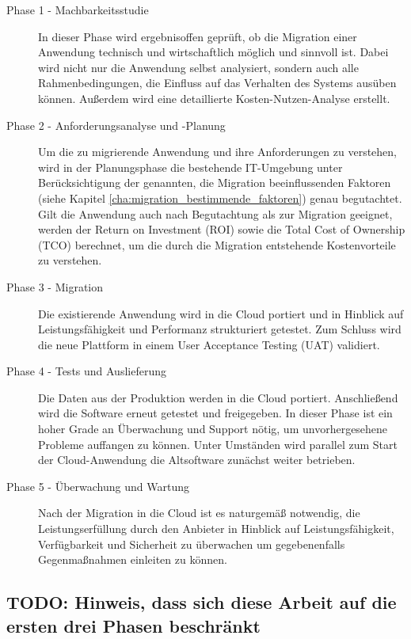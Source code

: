 \begin{description}
	\item[Phase 1 - Machbarkeitsstudie] In dieser Phase wird ergebnisoffen
geprüft, ob die Migration einer Anwendung technisch und wirtschaftlich möglich
und sinnvoll ist. Dabei wird nicht nur die Anwendung selbst analysiert, sondern
auch alle Rahmenbedingungen, die Einfluss auf das Verhalten des Systems ausüben
können. Außerdem wird eine detaillierte Kosten-Nutzen-Analyse erstellt.

	\item[Phase 2 - Anforderungsanalyse und -Planung] Um die zu migrierende
Anwendung und ihre Anforderungen zu verstehen, wird in der Planungsphase die
bestehende IT-Umgebung unter Berücksichtigung der genannten, die Migration
beeinflussenden Faktoren (siehe  Kapitel
\ref{cha:migration_bestimmende_faktoren})
genau begutachtet. Gilt die Anwendung auch nach Begutachtung als zur Migration
geeignet, werden der Return on Investment (ROI) sowie die Total Cost of
Ownership (TCO) berechnet, um die durch die Migration entstehende
Kostenvorteile
zu verstehen.

	\item[Phase 3 - Migration] Die existierende Anwendung wird in die Cloud
portiert und in Hinblick auf Leistungsfähigkeit und Performanz strukturiert
getestet. Zum Schluss wird die neue Plattform in einem User Acceptance Testing
(UAT) validiert.

	\item[Phase 4 - Tests und Auslieferung] Die Daten aus der Produktion
werden in die Cloud portiert. Anschließend wird die Software erneut getestet
und freigegeben. In dieser Phase ist ein hoher Grade an Überwachung und Support
nötig, um unvorhergesehene Probleme auffangen zu können. Unter Umständen wird
parallel zum Start der Cloud-Anwendung die Altsoftware zunächst weiter
betrieben.

	\item[Phase 5 - Überwachung und Wartung] Nach der Migration in die
Cloud ist es naturgemäß notwendig, die Leistungserfüllung durch den Anbieter in
Hinblick auf Leistungsfähigkeit, Verfügbarkeit und Sicherheit zu überwachen um
gegebenenfalls Gegenmaßnahmen einleiten zu können.
\end{description}


\subsection{TODO: Hinweis, dass sich diese Arbeit auf die ersten drei Phasen
beschränkt}

